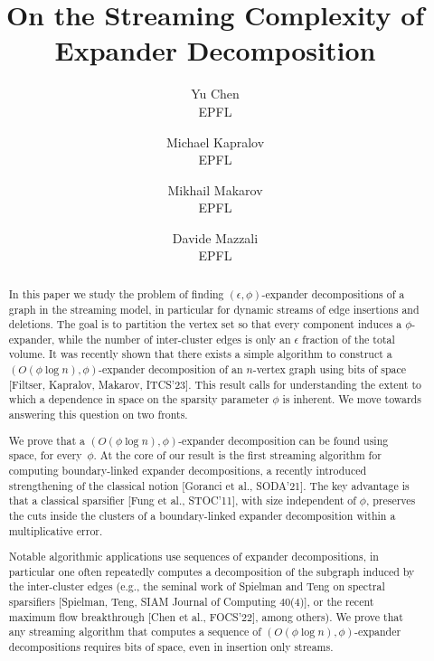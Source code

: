 \documentclass[epsfig,letter,11pt]{article}
\title{On the Streaming Complexity of Expander Decomposition}
\author{
	Yu Chen\\
	EPFL\\
	\and
	Michael Kapralov\\
	EPFL\\
	\and
	Mikhail Makarov\\
	EPFL\\
	\and
	Davide Mazzali\\
	EPFL\\}
\date{}
\numberwithin{equation}{section}
\begin{document}
\maketitle
\thispagestyle{empty}
\begin{abstract}
\noindent
In this paper we study the problem of finding $(\epsilon, \phi)$-expander decompositions of a graph in the streaming model, in particular for dynamic streams of edge insertions and deletions. The goal is to partition the vertex set so that every component induces a $\phi$-expander, while the number of inter-cluster edges is only an $\epsilon$ fraction of the total volume. It was recently shown that there exists a simple algorithm to construct a $(O(\phi \log n), \phi)$-expander decomposition of an $n$-vertex graph using  bits of space [Filtser, Kapralov, Makarov, ITCS'23]. This result calls for understanding the extent to which a dependence in space on the sparsity parameter $\phi$ is inherent. We move towards answering this question on two fronts.

We prove that a $(O(\phi \log n), \phi)$-expander decomposition can be found using~ space, for every~$\phi$.  At the core of our result is the first streaming algorithm for computing boundary-linked expander decompositions, a recently introduced strengthening of the classical notion [Goranci et al., SODA'21]. The key advantage is that a classical sparsifier [Fung et al., STOC'11], with size independent of $\phi$, preserves the cuts inside the clusters of a boundary-linked expander decomposition within a multiplicative error.

Notable algorithmic applications use sequences of expander decompositions, in particular one often repeatedly computes a decomposition of the subgraph induced by the inter-cluster edges (e.g., the seminal work of Spielman and Teng on spectral sparsifiers [Spielman, Teng, SIAM Journal of Computing 40(4)], or the recent maximum flow breakthrough [Chen et al., FOCS'22], among others). We prove that any streaming algorithm that computes a sequence of $(O(\phi \log n), \phi)$-expander decompositions requires  bits of space, even in insertion only streams.
\end{abstract}

\pagestyle{empty}
\newpage
\tableofcontents
\setcounter{page}{0}
\newpage

\pagestyle{plain}









\newpage




\newpage

\appendix


\end{document}
